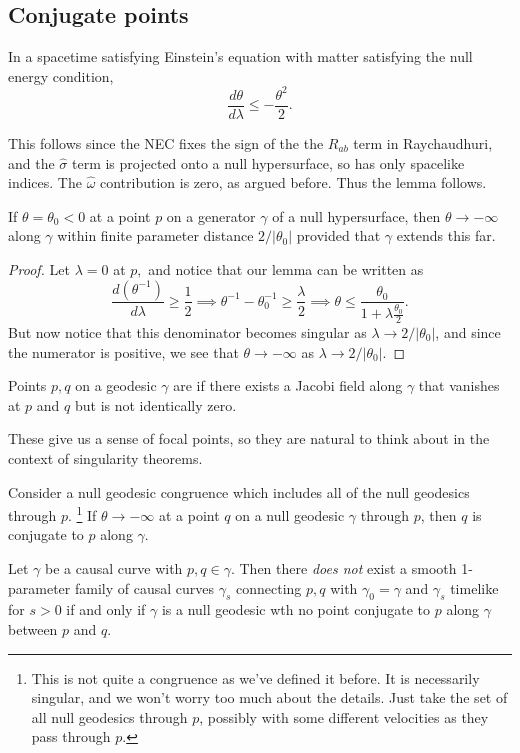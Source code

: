 \subsection*{Conjugate points}
\begin{lem}
In a spacetime satisfying Einstein's equation with matter satisfying the null energy condition,
\begin{equation}
    \frac{d\theta}{d\lambda}\leq -\frac{\theta^2}{2}.
\end{equation}
\end{lem}
This follows since the NEC fixes the sign of the the $R_{ab}$ term in Raychaudhuri, and the $\hat \sigma$ term is projected onto a null hypersurface, so has only spacelike indices. The $\hat \omega$ contribution is zero, as argued before. Thus the lemma follows.
\begin{cor}
    If $\theta=\theta_0 <0$ at a point $p$ on a generator $\gamma$ of a null hypersurface, then $\theta \to -\infty$ along $\gamma$ within finite parameter distance $2/|\theta_0|$  provided that $\gamma$ extends this far.
\end{cor}
\begin{proof}
    Let $\lambda=0$ at $p,$ and notice that our lemma can be written as
    \begin{equation}
        \frac{d(\theta^{-1})}{d\lambda} \geq \frac{1}{2} \implies \theta^{-1} -\theta_0^{-1}\geq \frac{\lambda}{2}\implies \theta \leq \frac{\theta_0}{1+\lambda\frac{\theta_0}{2}}.
    \end{equation}
    But now notice that this denominator becomes singular as $\lambda \to 2/|\theta_0|$, and since the numerator is positive, we see that $\theta\to -\infty$ as $\lambda\to 2/|\theta_0|$.
\end{proof}
\begin{defn}
    Points $p,q$ on a geodesic $\gamma$ are  if there exists a Jacobi field along $\gamma$ that vanishes at $p$ and $q$ but is not identically zero.
\end{defn}
These give us a sense of focal points, so they are natural to think about in the context of singularity theorems.
\begin{thm}\label{conjugatepoints}
    Consider a null geodesic congruence which includes all of the null geodesics through $p$.%
        \footnote{This is not quite a congruence as we've defined it before. It is necessarily singular, and we won't worry too much about the details. Just take the set of all null geodesics through $p$, possibly with some different velocities as they pass through $p.$}
    If $\theta \to -\infty$ at a point $q$ on a null geodesic $\gamma$ through $p$, then $q$ is conjugate to $p$ along $\gamma$.
\end{thm}
\begin{thm}
    Let $\gamma$ be a causal curve with $p,q\in \gamma$. Then there \emph{does not} exist a smooth 1-parameter family of causal curves $\gamma_s$ connecting $p,q$ with $\gamma_0=\gamma$ and $\gamma_s$ timelike for $s>0$ if and only if $\gamma$ is a null geodesic wth no point conjugate to $p$ along $\gamma$ between $p$ and $q$.
\end{thm}

